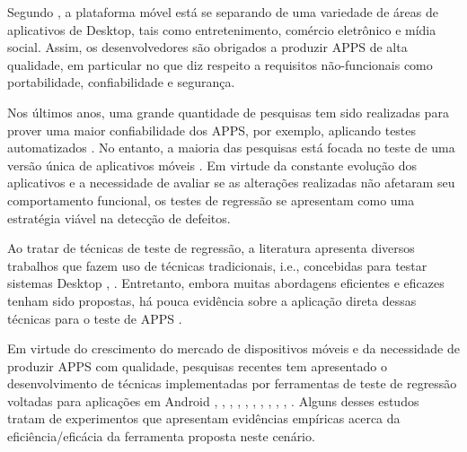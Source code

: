 Segundo , a plataforma móvel está se separando de uma variedade de áreas de aplicativos de Desktop, tais como entretenimento, comércio eletrônico e mídia social. Assim, os desenvolvedores são obrigados a produzir \ac{APPS} de alta qualidade, em particular no que diz respeito a requisitos não-funcionais como portabilidade, confiabilidade e segurança.


Nos últimos anos, uma grande quantidade de pesquisas tem sido realizadas para prover uma maior confiabilidade dos \ac{APPS}, por exemplo, aplicando testes automatizados \cite{7927972, 8424973, 8453877}. No entanto, a maioria das pesquisas está focada no teste de uma versão única de aplicativos móveis \cite{Do2016RedroidAR}. Em virtude da constante evolução dos aplicativos e a necessidade de avaliar se as alterações realizadas não afetaram seu comportamento funcional, os testes de regressão se apresentam como uma estratégia viável\cite{8377661} na detecção de defeitos.   



Ao tratar de técnicas de teste de regressão, a literatura apresenta diversos trabalhos que fazem uso de técnicas tradicionais, i.e., concebidas para testar sistemas Desktop \cite{536955}, \cite{ENGSTROM201014}. Entretanto, embora muitas abordagens eficientes e eficazes tenham sido propostas, há pouca evidência sobre a aplicação direta dessas técnicas para o teste de \ac{APPS} \cite{Do2016RedroidAR}. %


Em virtude do crescimento do mercado de dispositivos móveis e da necessidade de produzir \ac{APPS} com qualidade, pesquisas recentes tem apresentado o desenvolvimento de técnicas implementadas por ferramentas de teste de regressão voltadas para aplicações em Android \cite{Do2016RedroidAR}, \cite{Choi:2018:DMA:3180155.3180173}, \cite{8377661}, \cite{5954416}, \cite{7927972}, \cite{8424973}, \cite{6339502}, \cite{6569773}, \cite{7427895}, \cite{7832883}, \cite{7833000}. Alguns desses estudos tratam de experimentos que apresentam evidências empíricas acerca da eficiência/eficácia da ferramenta proposta neste cenário. %

